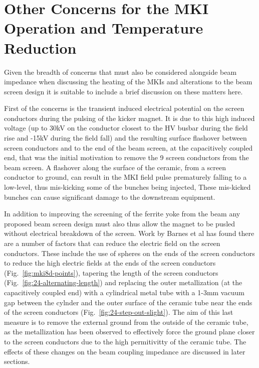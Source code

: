 \section{Other Concerns for the MKI Operation and Temperature Reduction}

Given the breadth of concerns that must also be considered alongside beam impedance when discussing the heating of the MKIs and alterations to the beam screen design it is suitable to include a brief discussion on these matters here. 

First of the concerns is the transient induced electrical potential on the screen conductors during the pulsing of the kicker magnet. It is due to this high induced voltage (up to 30kV on the conductor closest to the HV busbar during the field rise and -15kV during the field fall) and the resulting surface flashover between screen conductors and to the end of the beam screen, at the capacitively coupled end, that was the initial motivation to remove the 9 screen conductors from the beam screen. A flashover along the surface of the ceramic, from a screen conductor to ground, can result in the MKI field pulse prematurely falling to a low-level, thus mis-kicking some of the bunches being injected, These mis-kicked bunches can cause significant damage to the downstream equipment.

In addition to improving the screening of the ferrite yoke from the beam any proposed beam screen design must also thus allow the magnet to be pusled without electrical breakdown of the screen. Work by Barnes et al \cite{Barnes:eFieldMKI} has found there are a number of factors that can reduce the electric field on the screen conductors. These include the use of spheres on the ends of the screen conductors to reduce the high electric fields at the ends of the screen conductors (Fig.~\ref{fig:mki8d-points}), tapering the length of the screen conductors (Fig.~\ref{fig:24-alternating-length}) and replacing the outer metallization (at the capacitively coupled end) with a cylindrical metal tube with a 1-3mm vacuum gap between the cylnder and the outer surface of the ceramic tube near the ends of the screen conductors (Fig.~\ref{fig:24-step-out-slight}). The aim of this last measure is to remove the external ground from the outside of the ceramic tube, as the metallization has been observed to effectively force the ground plane closer to the screen conductors due to the high permitivitty of the ceramic tube. The effects of these changes on the beam coupling impedance are discussed in later sections.

